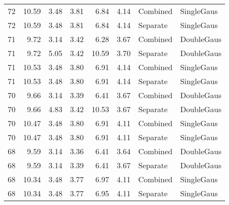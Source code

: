 \begin{tabular}{lrrrrrll}
 72   &                       10.59 &               3.48 &                         3.81 &              6.84 &               4.14 & Combined & SingleGaus \\
 72   &                       10.59 &               3.48 &                         3.81 &              6.84 &               4.14 & Separate & SingleGaus \\
 71   &                        9.72 &               3.14 &                         3.42 &              6.28 &               3.67 & Combined & DoubleGaus \\
 71   &                        9.72 &               5.05 &                         3.42 &             10.59 &               3.70 & Separate & DoubleGaus \\
 71   &                       10.53 &               3.48 &                         3.80 &              6.91 &               4.14 & Combined & SingleGaus \\
 71   &                       10.53 &               3.48 &                         3.80 &              6.91 &               4.14 & Separate & SingleGaus \\
 70   &                        9.66 &               3.14 &                         3.39 &              6.41 &               3.67 & Combined & DoubleGaus \\
 70   &                        9.66 &               4.83 &                         3.42 &             10.53 &               3.67 & Separate & DoubleGaus \\
 70   &                       10.47 &               3.48 &                         3.80 &              6.91 &               4.11 & Combined & SingleGaus \\
 70   &                       10.47 &               3.48 &                         3.80 &              6.91 &               4.11 & Separate & SingleGaus \\
 68   &                        9.59 &               3.14 &                         3.36 &              6.41 &               3.64 & Combined & DoubleGaus \\
 68   &                        9.59 &               3.14 &                         3.39 &              6.41 &               3.67 & Separate & DoubleGaus \\
 68   &                       10.34 &               3.48 &                         3.77 &              6.97 &               4.11 & Combined & SingleGaus \\
 68   &                       10.34 &               3.48 &                         3.77 &              6.95 &               4.11 & Separate & SingleGaus \\

\end{tabular}
